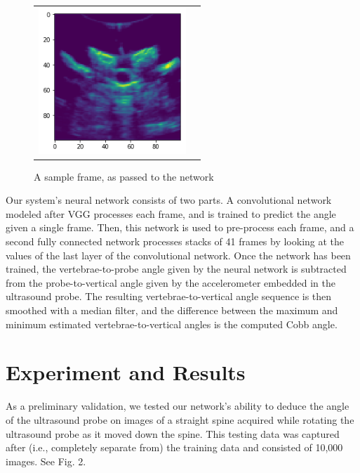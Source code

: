 \documentclass{article}
\begin{document}
\begin{figure}
\centering
\begin{tabular}{cc}
\centering
\includegraphics[height=5.5cm,keepaspectratio]{SampleInput}
\end{tabular}
\caption{A sample frame, as passed to the network
}
\end{figure}


Our system’s neural network consists of two parts. A convolutional network modeled after VGG processes each frame, and is trained to predict the angle given a single frame. Then, this network is used to pre-process each frame, and a second fully connected network processes stacks of 41 frames by looking at the values of the last layer of the convolutional network. 
Once the network has been trained, the vertebrae-to-probe angle given by the neural network is subtracted from the probe-to-vertical angle given by the accelerometer embedded in the ultrasound probe. The resulting vertebrae-to-vertical angle sequence is then smoothed with a median filter, and the difference between the maximum and minimum estimated vertebrae-to-vertical angles is the computed Cobb angle.   

\section{Experiment and Results}

As a preliminary validation, we tested our network’s ability to deduce the angle of the ultrasound probe on images of a straight spine acquired while rotating the ultrasound probe as it moved down the spine.  This testing data was captured after (i.e., completely separate from) the training data and consisted of 10,000 images.  See Fig. 2.
\end{document}
